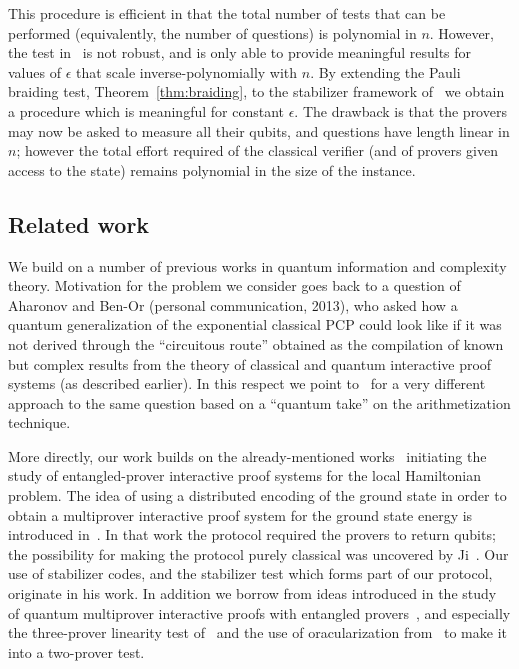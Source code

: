 \documentclass[11pt,letterpaper]{article}
\newcommand{\<}{\langle}
\renewcommand{\>}{\rangle}
\newcommand{\eps}{\epsilon}
\begin{document}
This procedure is efficient in that the total number of tests that can
be performed (equivalently, the number of questions) is polynomial in
$n$. However, the test in~\cite{FV14,ji2015classical} is not robust,
and is only able to provide meaningful results for values of $\eps$
that scale inverse-polynomially with $n$. By extending the Pauli
braiding test, Theorem~\ref{thm:braiding}, to the stabilizer framework
of~\cite{ji2015classical} we obtain a procedure which is meaningful
for constant $\eps$. The drawback is that the provers may now be asked
to measure all their qubits, and questions have length linear in $n$;
however the total effort required of the classical verifier (and of provers given access to the state) remains
polynomial in the size of the instance.






\subsection{Related work}
\label{sec:related}

We build on a number of previous works in quantum information
and complexity theory. 
Motivation for the problem we consider goes back to a question of Aharonov and Ben-Or (personal communication, 2013), who asked how a quantum generalization of the exponential classical PCP could look like if it was not derived through the ``circuitous route'' obtained as the compilation of known but complex results from the theory of classical and quantum interactive proof systems (as described earlier). In this respect we point to~\cite[Section
  5]{AharonovAV13qpcp} for a very different approach to the same question based on a ``quantum take'' on the arithmetization technique. 
	
  More directly, our work builds on the already-mentioned
  works~\cite{FV14, ji2015classical} initiating the study of
  entangled-prover interactive proof systems for the local Hamiltonian
  problem. The idea of using a distributed encoding of the ground
  state in order to obtain a multiprover interactive proof system for
  the ground state energy is introduced in~\cite{FV14}. In that work
  the protocol required the provers to return qubits; the possibility
  for making the protocol purely classical was uncovered by
  Ji~\cite{ji2015classical}. Our use of stabilizer codes, and the
  stabilizer test which forms part of our protocol, originate in his
  work. In addition we borrow from ideas introduced in the study of 
quantum multiprover interactive proofs with entangled provers~\cite{KM03, CHTW04}, and especially the three-prover linearity test of~\cite{IV12} and the use of oracularization from~\cite{IKM09} to make it into a two-prover test. 
		
\end{document}
